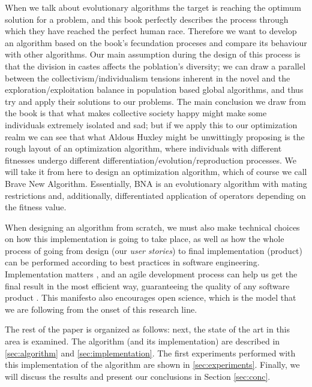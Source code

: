 When we talk about evolutionary algorithms the target is reaching the optimum
solution for a problem, and this book perfectly describes the process through
which they have reached the perfect human race. Therefore we want to develop an
algorithm based on the book's fecundation proceses and compare its behaviour
with other algorithms. Our main assumption during the design of this process is
that the division in castes affects the poblation's diversity; we can draw a
parallel between the collectivism/individualism tensions inherent in the novel
and the exploration/exploitation balance in population based global algorithms,
and thus try and apply their solutions to our problems. The main conclusion we
draw from the book is that what makes collective society happy might make some
individuals extremely isolated and sad; but if we apply this to our optimization
realm we can see that what Aldous Huxley might be unwittingly proposing is the
rough layout of an optimization algorithm, where individuals with different
fitnesses undergo different differentiation/evolution/reproduction processes. We
will take it from here to design an optimization algorithm, which of course we
call {\sf Brave New Algorithm}. Essentially, {\sf BNA} is an evolutionary
algorithm with mating restrictions and, additionally, differentiated application
of operators depending on the fitness value.

When designing an algorithm from scratch, we must also make technical
choices on how this implementation is going to take place, as well as
how the whole process of going from design (our {\em user stories}) to
final implementation (product) can be performed according to best
practices in software engineering. Implementation matters
\cite{merelo2011implementation}, and an agile development process can
help us get the final result in the most efficient way, guaranteeing
the quality of any software product \cite{agile_manifesto}. This manifesto also
encourages open science, which is the model that we are following from the onset
of this research line.

The rest of the paper is organized as follows: next, the state of the art in
this area is examined. The algorithm (and its implementation) are described in
\ref{sec:algorithm} and \ref{sec:implementation}. The first experiments
performed with this implementation of the algorithm are shown in
\ref{sec:experiments}. Finally, we will discuss the results and present our
conclusions in Section \ref{sec:conc}.